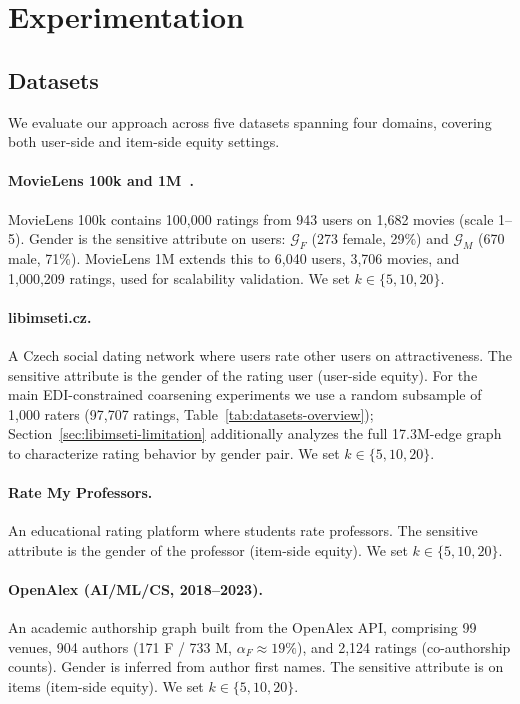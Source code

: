 \documentclass[runningheads]{llncs}
\begin{document}
\section{Experimentation}\label{sec:experimentation}
\subsection{Datasets}

We evaluate our approach across five datasets spanning four domains,
covering both user-side and item-side equity settings.

\paragraph{MovieLens 100k and 1M~\cite{harper2015movielens}.}
MovieLens 100k contains 100,000 ratings from 943 users on 1,682 movies
(scale 1--5). Gender is the sensitive attribute on users: $\mathcal{G}_F$
(273 female, 29\%) and $\mathcal{G}_M$ (670 male, 71\%). MovieLens 1M
extends this to 6,040 users, 3,706 movies, and 1,000,209 ratings, used
for scalability validation. We set $k \in \{5, 10, 20\}$.

\paragraph{libimseti.cz.}
A Czech social dating network where users rate other users on attractiveness.
The sensitive attribute is the gender of the rating user (user-side equity).
For the main EDI-constrained coarsening experiments we use a random
subsample of 1,000 raters (97,707 ratings, Table~\ref{tab:datasets-overview});
Section~\ref{sec:libimseti-limitation} additionally analyzes the full
17.3M-edge graph to characterize rating behavior by gender pair. We set
$k \in \{5, 10, 20\}$.

\paragraph{Rate My Professors.}
An educational rating platform where students rate professors. The sensitive
attribute is the gender of the professor (item-side equity). We set
$k \in \{5, 10, 20\}$.

\paragraph{OpenAlex (AI/ML/CS, 2018--2023).}
An academic authorship graph built from the OpenAlex API,
comprising 99 venues, 904 authors (171 F / 733 M, $\alpha_F \approx 19\%$),
and 2,124 ratings (co-authorship counts). Gender is inferred from author
first names. The sensitive attribute is on items (item-side equity).
We set $k \in \{5, 10, 20\}$.
\end{document}
